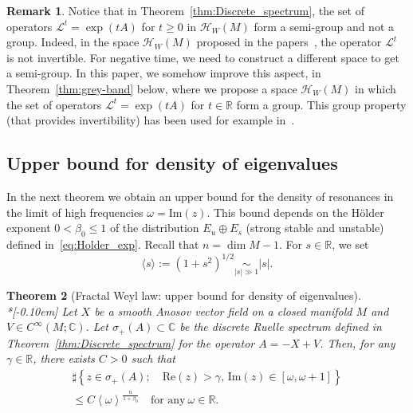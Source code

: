 \documentclass[10pt]{amsart}
\newtheorem{theo}{Theorem}[section]
\theoremstyle{definition}\newtheorem{defi}[theo]{Definition}\newtheorem{rema}[theo]{Remark}\newtheorem{exam}[theo]{Example}\newtheorem{exem}[theo]{Example}\newtheorem{nota}[theo]{Notation}
\newcommand{\clH}{\mathcal{H}}
\newcommand{\clL}{\mathcal{L}}
\newcommand{\Ree}{\mathrm{Re}}
\newcommand{\Imm}{\mathrm{Im}}
\newcommand{\bbR}{\mathbb{R}}
\newcommand{\bbC}{\mathbb{C}}
\begin{document}
\begin{rema}
Notice that in Theorem~\ref{thm:Discrete_spectrum}, the set of operators $\clL^{t}=\exp(tA)$ for $t\geq0$ in $\clH _{W}(M)$ form a semi-group and not a group. Indeed, in the space $\clH _{W}(M)$ proposed in the papers~\cite{liverani_butterley_07,fred_flow_09}, the operator $\clL^{t}$ is not invertible. For negative time, we need to construct a different space to get a semi-group. In this paper, we somehow improve this aspect, in Theorem~\ref{thm:grey-band} below, where we propose a space $\clH _{W}(M)$ in which the set of operators $\clL^{t}=\exp(tA)$ for $t\in\bbR$ form a group. This group property (that provides invertibility) has been used for example in~\cite{faure-tsujii_anosov_flows_16}.
\end{rema}


\subsection{Upper bound for density of eigenvalues}
In the next theorem we obtain an upper bound for the density of resonances in the limit of high frequencies $\omega=\Imm(z)$. This bound depends on the H\"older exponent $0<\beta_{0}\leq1$ of the distribution $E_{u}\oplus E_{s}$ (strong stable and unstable) defined in~\eqref{eq:Holder_exp}. Recall that $n=\dim M-1$. For $s\in\bbR$, we set
\begin{equation}\label{eq:def_Japonese_bracket}
\langle s\rangle:=\left(1+s^{2}\right)^{1/2}\underset{\left|s\right|\gg1}{\sim}\left|s\right|.
\end{equation}

\begin{tcolorbox}[enhanced, frame style={teal!80}, interior style={cyan!0},breakable]

\begin{theo}[Fractal Weyl law: upper bound for density of eigenvalues]\label{thm:Weyl law}\ \\*[-0.10em]
Let $X$ be a smooth Anosov vector field on a closed manifold $M$ and $V\in C^{\infty}(M;\bbC)$. Let $\sigma_{+}(A)\subset\bbC$ be the discrete Ruelle spectrum defined in Theorem~\ref{thm:Discrete_spectrum} for the operator $A=-X+V$. Then, for any $\gamma\in\bbR$, there exists $C>0$ such that
\begin{multline}\label{eq:weyl_upper_bound}
\sharp\left\{ z\in\sigma_{+}\left(A\right);\quad\Ree\left(z\right)>\gamma,\,\Imm\left(z\right)\in\left[\omega,\omega+1\right]\right\}\\ \leq C\left\langle \omega\right\rangle ^{\frac{n}{1+\beta_{0}}} \quad\text{for any}\:\omega\in\bbR.
\end{multline}
\end{theo}

\end{tcolorbox}
\end{document}
